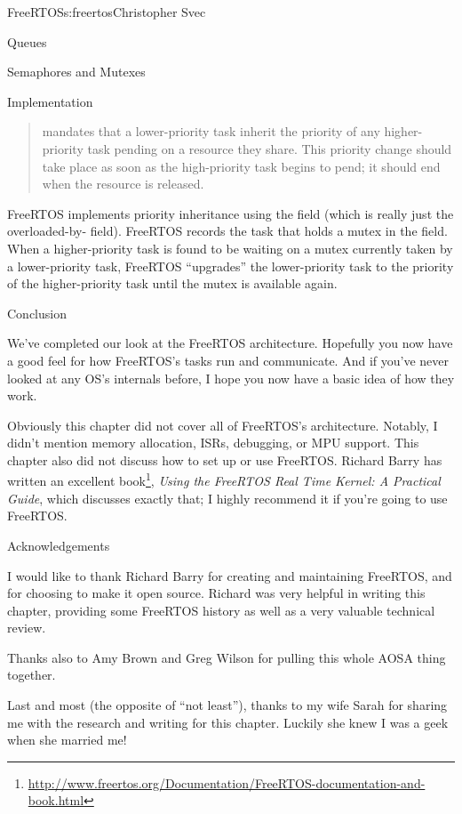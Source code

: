 \begin{aosachapter}{FreeRTOS}{s:freertos}{Christopher Svec}
\begin{aosasect1}{Queues}
\begin{aosasect2}{Semaphores and Mutexes}
\begin{aosasect3}{Implementation}
\begin{quotation}
 mandates that a lower-priority task inherit the priority 
of any higher-priority task pending on a resource they share. This priority change 
should take place as soon as the high-priority task begins to pend; it should end 
when the resource is released.
\end{quotation}

FreeRTOS implements priority inheritance using the
 field (which is really just the
overloaded-by-  field). FreeRTOS records
the task that holds a mutex in the  field.  When a
higher-priority task is found to be waiting on a mutex currently taken
by a lower-priority task, FreeRTOS ``upgrades'' the lower-priority
task to the priority of the higher-priority task until the mutex is
available again.

\end{aosasect3}

\end{aosasect2}

\end{aosasect1}

\begin{aosasect1}{Conclusion}

We've completed our look at the FreeRTOS architecture.  Hopefully you
now have a good feel for how FreeRTOS's tasks run and communicate. And
if you've never looked at any OS's internals before, I hope you now have a
basic idea of how they work.

Obviously this chapter did not cover all of FreeRTOS's
architecture. Notably, I didn't mention memory allocation, ISRs,
debugging, or MPU support.  This chapter also did not discuss how to set up or use
FreeRTOS. Richard Barry has written an excellent
book\footnote{\url{http://www.freertos.org/Documentation/FreeRTOS-documentation-and-book.html}},
\emph{Using the FreeRTOS Real Time Kernel: A Practical Guide}, which
discusses exactly that;
I highly recommend it if you're going to use
FreeRTOS.

\end{aosasect1}

\begin{aosasect1}{Acknowledgements}

I would like to thank Richard Barry for creating and maintaining
FreeRTOS, and for choosing to make it open source. Richard was very
helpful in writing this chapter, providing some FreeRTOS history as
well as a very valuable technical review.

Thanks also to Amy Brown and Greg Wilson for pulling this whole AOSA
thing together.

Last and most (the opposite of ``not least''), thanks to my wife Sarah
for sharing me with the research and writing for this chapter. Luckily
she knew I was a geek when she married me!

\end{aosasect1}

\end{aosachapter}
